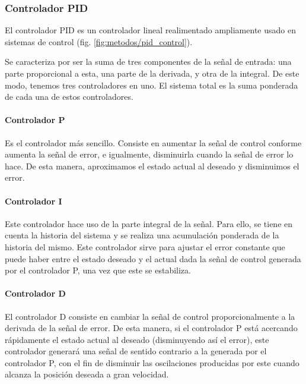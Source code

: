 \subsubsection{Controlador PID}
El controlador PID \cite{rivera1986internal} es un controlador lineal realimentado ampliamente usado en sistemas de control (fig. \ref{fig:metodos/pid_control}).

Se caracteriza por ser la suma de tres componentes de la señal de entrada: una parte proporcional a esta, una parte de la derivada, y otra de la integral. De este modo, tenemos tres controladores en uno. El sistema total es la suma ponderada de cada una de estos controladores.


\paragraph{Controlador P}
Es el controlador más sencillo. Consiste en aumentar la señal de control conforme aumenta la señal de error, e igualmente, disminuirla cuando la señal de error lo hace. De esta manera, aproximamos el estado actual al deseado y disminuimos el error.

\paragraph{Controlador I}
Este controlador hace uso de la parte integral de la señal. Para ello, se tiene en cuenta la historia del sistema y se realiza una acumulación ponderada de la historia del mismo. Este controlador sirve para ajustar el error constante que puede haber entre el estado deseado y el actual dada la señal de control generada por el controlador P, una vez que este se estabiliza.

\paragraph{Controlador D}
El controlador D consiste en cambiar la señal de control proporcionalmente a la derivada de la señal de error. De esta manera, si el controlador P está acercando rápidamente el estado actual al deseado (disminuyendo así el error), este controlador generará una señal de sentido contrario a la generada por el controlador P, con el fin de disminuir las oscilaciones producidas por este cuando alcanza la posición deseada a gran velocidad. 

